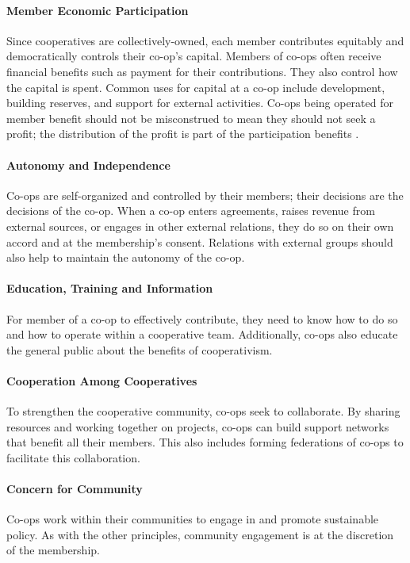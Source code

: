 \paragraph{Member Economic Participation} Since cooperatives are collectively-owned, each member contributes equitably and democratically controls their co-op's capital. Members of co-ops often receive financial benefits such as payment for their contributions. They also control how the capital is spent. Common uses for capital at a co-op include development, building reserves, and support for external activities. Co-ops being operated for member benefit should not be misconstrued to mean they should not seek a profit; the distribution of the profit is part of the participation benefits \autocite[29]{boland_introduction_2017}. 

\paragraph{Autonomy and Independence} Co-ops are self-organized and controlled by their members; their decisions are the decisions of the co-op. When a co-op enters agreements, raises revenue from external sources, or engages in other external relations, they do so on their own accord and at the membership's consent. Relations with external groups should also help to maintain the autonomy of the co-op. 

\paragraph{Education, Training and Information} For member of a co-op to effectively contribute, they need to know how to do so and how to operate within a cooperative team. Additionally, co-ops also educate the general public about the benefits of cooperativism.

\paragraph{Cooperation Among Cooperatives} To strengthen the cooperative community, co-ops seek to collaborate. By sharing resources and working together on projects, co-ops can build support networks that benefit all their members. This also includes forming federations of co-ops to facilitate this collaboration.

\paragraph{Concern for Community} Co-ops work within their communities to engage in and promote sustainable policy. As with the other principles, community engagement is at the discretion of the membership. 


